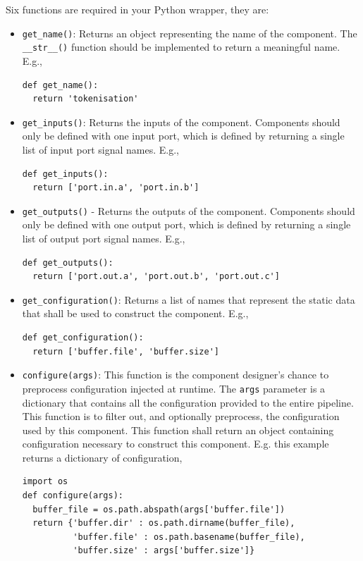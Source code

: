 Six functions are required in your Python wrapper, they are:
\begin{itemize}
\item \texttt{get\_name()}: Returns an object representing the name of the component. The \texttt{\_\_str\_\_()} function should be implemented to return a meaningful name. E.g.,
\begin{verbatim}
def get_name():
  return 'tokenisation'
\end{verbatim}
\item \texttt{get\_inputs()}: Returns the inputs of the component. Components should only be defined with one input port, which is defined by returning a single list of input port signal names. E.g.,
\begin{verbatim}
def get_inputs():
  return ['port.in.a', 'port.in.b']
\end{verbatim}
\item \texttt{get\_outputs()} - Returns the outputs of the component. Components should only be defined with one output port, which is defined by returning a single list of output port signal names. E.g.,
\begin{verbatim}
def get_outputs():
  return ['port.out.a', 'port.out.b', 'port.out.c']
\end{verbatim}
\item \texttt{get\_configuration()}: Returns a list of names that represent the static data that shall be used to construct the component. E.g.,
\begin{verbatim}
def get_configuration():
  return ['buffer.file', 'buffer.size']
\end{verbatim}
\item \texttt{configure(args)}: This function is the component designer's chance to preprocess configuration injected at runtime. The \texttt{args} parameter is a dictionary that contains all the configuration provided to the entire pipeline. This function is to filter out, and optionally preprocess, the configuration used by this component. This function shall return an object containing configuration necessary to construct this component. E.g. this example returns a dictionary of configuration,
\begin{verbatim}
import os
def configure(args):
  buffer_file = os.path.abspath(args['buffer.file'])
  return {'buffer.dir' : os.path.dirname(buffer_file),
          'buffer.file' : os.path.basename(buffer_file),
          'buffer.size' : args['buffer.size']}
\end{verbatim}

\end{itemize}
